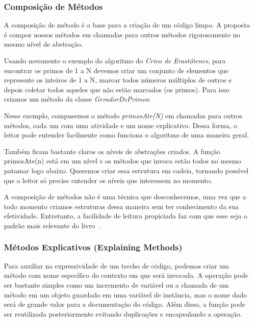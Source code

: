 \subsubsection{Composição de Métodos}
\label{metodos:composicao}
A composição de método é a base para a criação de um código limpo. A proposta é compor nossos métodos em chamadas para outros métodos rigorosamente no mesmo nível de abstração.
	
Usando novamente o exemplo do algoritmo do \textit{Crivo de Erastótenes}, para encontrar os primos de 1 a N devemos criar um conjunto de elementos que represente os inteiros de 1 a N, marcar todos números múltiplos de outros e depois coletar todos aqueles que não estão marcados (os primos). Para isso criamos um método da classe \textit{GeradorDePrimos}:



Nesse exemplo, compusemos o método \textit{primosAte(N)} em chamadas para outros métodos, cada um com uma atividade e um nome explicativo. Dessa forma, o leitor pode entender facilmente como funciona o algoritmo de uma maneira geral. 
	
Também ficam bastante claros os níveis de abstrações criados. A função primosAte(n) está em um nível e os métodos que invoca estão todos no mesmo patamar logo abaixo. Queremos criar essa estrutura em cadeia, tornando possível que o leitor só precise entender os níveis que interessem no momento.
	
A composição de métodos não é uma técnica que desconhecemos, uma vez que a todo momento criamos estruturas dessa maneira sem ter conhecimento da sua efetividade. Entretanto, a facilidade de leitura propiciada faz com que esse seja o padrão mais relevante do livro~\citep{Beck2007, InfoQ2010}. 	

\subsubsection{Métodos Explicativos (Explaining Methods)}
\label{metodos:explicativos}
Para auxiliar na expressividade de um trecho de código, podemos criar um método com nome específico do contexto em que será invocada. A operação pode ser bastante simples como um incremento de variável ou a chamada de um método em um objeto guardado em uma variável de instância, mas o nome dado será de grande valor para a documentação do código. Além disso, a função pode ser reutilizada posteriormente evitando duplicações e encapsulando a operação.
	
